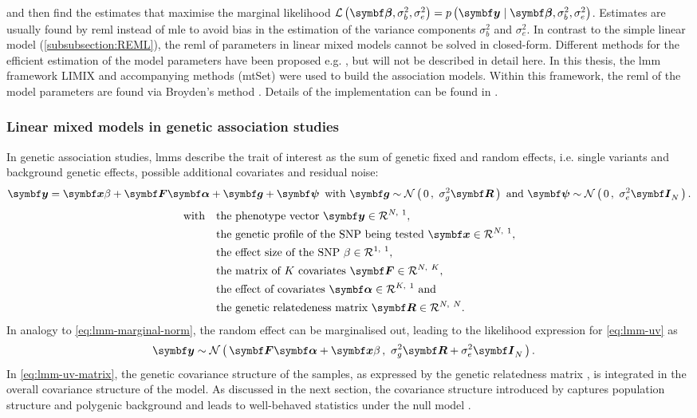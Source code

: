 %
and then find the estimates that maximise the marginal likelihood \(\mathcal{L}\left(\mat{\beta}, \sigma_b^2, \sigma_e^2\right) = p\left(\mat{y}\mid \mat{\beta},\sigma_b^2, \sigma_e^2\right)\). 
Estimates are usually found by \gls{reml} instead of \gls{mle} to avoid bias in the estimation of the variance components \(\sigma_b^2\) and \( \sigma_e^2\). In contrast to the simple linear model (\cref{subsubsection:REML}), the \gls{reml} of parameters in linear mixed models cannot be solved in closed-form. Different methods for the efficient estimation of the model parameters have been proposed e.g. \citep{Lippert2011}, but will not be described in detail here. In this thesis, the \gls{lmm} framework LIMIX and accompanying methods (mtSet) were used to build the association models. Within this framework, the \gls{reml} of the model parameters are found via Broyden's method \citep{Broyden1965}. Details of the implementation can be found in \citep[Supplementary material]{Casale2015}.

\subsubsection{Linear mixed models in genetic association studies}
\label{subsection:lmm-genetics}
In genetic association studies, \glspl{lmm} describe the trait of interest as the sum of genetic fixed and random effects, i.e. single variants and background genetic effects, possible additional covariates and residual noise: 
%
\begin{equation}
\mat{y} =\mat{x}\beta + \mat{F}\mat{\alpha} + \mat{g}+\mat{\psi} \, \text{ with } \mat{g} \sim \normal 0 {\sigma_g^2\mat{R}} \text{ and } \mat{\psi} \sim\normal 0 {\sigma_e^2\mat{I}_N}.
\label{eq:lmm-uv}
\end{equation}
%
\begin{align*} 
\text{with }\,\,\,\,& \text{the phenotype vector }\mat{y} \inR N 1,\\
& \text{the genetic profile of the SNP being tested }\mat{x} \inR N 1,\\
& \text{the effect size of the SNP } \beta \inR 1 1,\\ 
& \text{the matrix of $K$ covariates }\mat{F} \inR N K,\\ 
& \text{the effect of covariates } \mat{\alpha} \inR K 1 \text{ and}\\
& \text{the genetic relatedeness matrix }\mat{R} \inR N N.
\end{align*} 
%
In analogy to \cref{eq:lmm-marginal-norm}, the random effect  can be marginalised out, leading to the likelihood expression for \cref{eq:lmm-uv} as
\begin{align}
\mat{y} &\sim \normal {\mat{F}\mat{\alpha} +\mat{x}\beta}{\sigma_g^2\mat{R} + \sigma_e^2\mat{I}_N}.
\label{eq:lmm-uv-matrix}
\end{align}
%
In \cref{eq:lmm-uv-matrix}, the genetic covariance structure of the samples, as expressed by the genetic relatedness matrix , is integrated in the overall covariance structure of the model. As discussed in the next section, the covariance structure introduced by  captures population structure and polygenic background and leads to well-behaved statistics under the null model \citep{Yu2006,Kang2008}.

